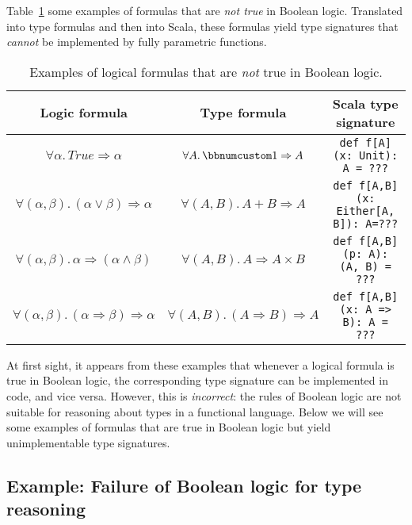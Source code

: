 Table~\ref{tab:Logical-formulas-not-Boolean-theorems} some examples
of formulas that are \emph{not true} in Boolean logic. Translated
into type formulas and then into Scala, these formulas yield type
signatures that \emph{cannot} be implemented by fully parametric functions.

\begin{table}
\begin{centering}
\begin{tabular}{|c|c|c|}
\hline 
\textbf{\small{}Logic formula} & \textbf{\small{}Type formula} & \textbf{\small{}Scala type signature}\tabularnewline
\hline 
\hline 
{\footnotesize{}$\forall\alpha.\,True\Rightarrow\alpha$} & {\footnotesize{}$\forall A.\,\bbnum 1\Rightarrow A$} & \lstinline!def f[A](x: Unit): A = ???!\tabularnewline
\hline 
{\footnotesize{}$\forall(\alpha,\beta).\,(\alpha\vee\beta)\Rightarrow\alpha$} & {\footnotesize{}$\forall(A,B).\,A+B\Rightarrow A$} & \lstinline!def f[A,B](x: Either[A, B]): A=???!\tabularnewline
\hline 
{\footnotesize{}$\forall(\alpha,\beta).\,\alpha\Rightarrow(\alpha\wedge\beta)$} & {\footnotesize{}$\forall(A,B).\,A\Rightarrow A\times B$} & \lstinline!def f[A,B](p: A): (A, B) = ???!\tabularnewline
\hline 
{\footnotesize{}$\forall(\alpha,\beta).\,(\alpha\Rightarrow\beta)\Rightarrow\alpha$} & {\footnotesize{}$\forall(A,B).\,(A\Rightarrow B)\Rightarrow A$} & \lstinline!def f[A,B](x: A => B): A = ???!\tabularnewline
\hline 
\end{tabular}
\par\end{centering}
\caption{Examples of logical formulas that are \emph{not} true in Boolean logic.\label{tab:Logical-formulas-not-Boolean-theorems}}
\end{table}

At first sight, it appears from these examples that whenever a logical
formula is true in Boolean logic, the corresponding type signature
can be implemented in code, and vice versa. However, this is \emph{incorrect}:
the rules of Boolean logic are not suitable for reasoning about types
in a functional language. Below we will see some examples of formulas
that are true in Boolean logic but yield unimplementable type signatures.

\subsection{Example: Failure of Boolean logic for type reasoning\label{subsec:Example:-Failure-of-Boolean-logic}}

